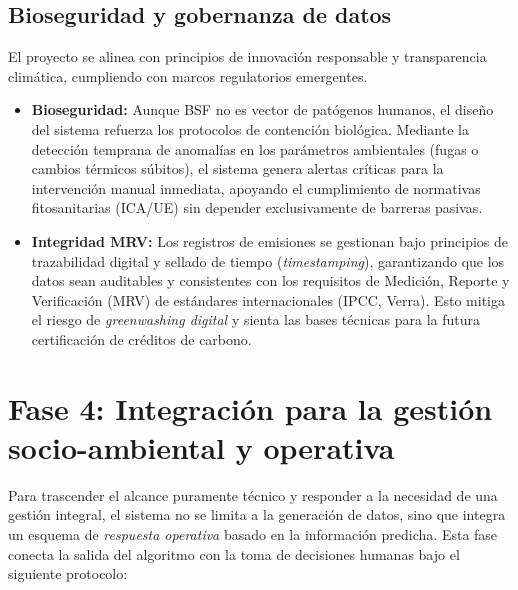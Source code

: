 \subsection{Bioseguridad y gobernanza de datos}
El proyecto se alinea con principios de innovación responsable y transparencia climática, cumpliendo con marcos regulatorios emergentes.

\begin{itemize}
    \item \textbf{Bioseguridad:} Aunque BSF no es vector de patógenos humanos, el diseño del sistema refuerza los protocolos de contención biológica. Mediante la detección temprana de anomalías en los parámetros ambientales (fugas o cambios térmicos súbitos), el sistema genera alertas críticas para la intervención manual inmediata, apoyando el cumplimiento de normativas fitosanitarias (ICA/UE) sin depender exclusivamente de barreras pasivas.
    
    \item \textbf{Integridad MRV:} Los registros de emisiones se gestionan bajo principios de trazabilidad digital y sellado de tiempo (\textit{timestamping}), garantizando que los datos sean auditables y consistentes con los requisitos de Medición, Reporte y Verificación (MRV) de estándares internacionales (IPCC, Verra). Esto mitiga el riesgo de \textit{greenwashing digital} y sienta las bases técnicas para la futura certificación de créditos de carbono.
\end{itemize}

\section{Fase 4: Integración para la gestión socio-ambiental y operativa}

Para trascender el alcance puramente técnico y responder a la necesidad de una gestión integral, el sistema no se limita a la generación de datos, sino que integra un esquema de \textit{respuesta operativa} basado en la información predicha. Esta fase conecta la salida del algoritmo con la toma de decisiones humanas bajo el siguiente protocolo:

